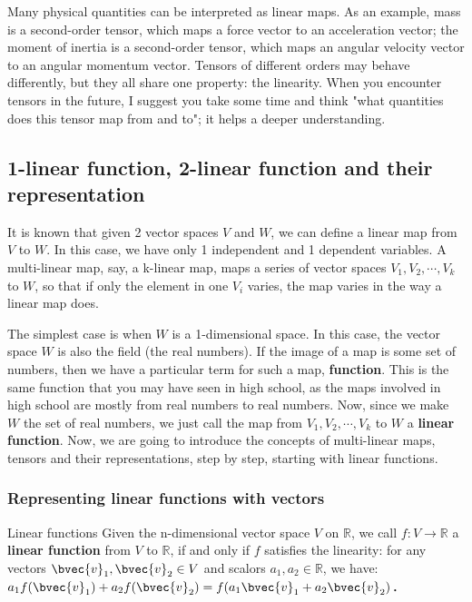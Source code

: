Many physical quantities can be interpreted as linear maps. As an example, mass is a second-order tensor, which maps a force vector to an acceleration vector; the moment of inertia is a second-order tensor, which maps an angular velocity vector to an angular momentum vector. Tensors of different orders may behave differently, but they all share one property: the linearity. When you encounter tensors in the future, I suggest you take some time and think "what quantities does this tensor map from and to"; it helps a deeper understanding. 



\subsection{1-linear function, 2-linear function and their representation}

It is known that given 2 vector spaces $V$ and $W$, we can define a linear map from $V$ to $W$. In this case, we have only 1 independent and 1 dependent variables. A multi-linear map, say, a k-linear map, maps a series of vector spaces $V_1, V_2, \cdots, V_k$ to $W$, so that if only the element in one $V_i$ varies, the map varies in the way a linear map does. 

The simplest case is when $W$ is a 1-dimensional space. In this case, the vector space $W$ is also the field (the real numbers). If the image of a map is some set of numbers, then we have a particular term for such a map, \textbf{function}. This is the same function that you may have seen in high school, as the maps involved in high school are mostly from real numbers to real numbers. Now, since we make $W$ the set of real numbers, we just call the map from $V_1, V_2, \cdots, V_k$ to $W$ a \textbf{linear function}. Now, we are going to introduce the concepts of multi-linear maps, tensors and their representations, step by step, starting with linear functions. 

\subsubsection{Representing linear functions with vectors}

\begin{definition}{Linear functions}
Given the n-dimensional vector space $V$ on $\mathbb{R}$, we call $f:V\rightarrow \mathbb{R}$ a \textbf{linear function} from $V$ to $\mathbb{R}$, if and only if $f$ satisfies the linearity: for any vectors $\bvec{v}_1, \bvec{v}_2\in V$ and scalors $a_1, a_2\in\mathbb{R}$, we have: $a_1f(\bvec{v}_1)+a_2f(\bvec{v}_2)=f(a_1\bvec{v}_1+a_2\bvec{v}_2)$．

\end{definition}



